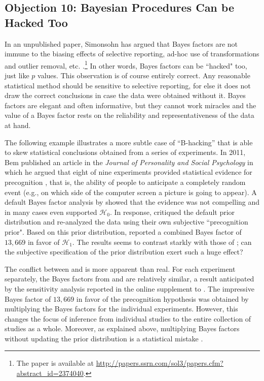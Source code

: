 \subsection{Objection 10: Bayesian Procedures Can be Hacked Too}
In an unpublished paper, Simonsohn has argued that Bayes factors are not immune to the biasing effects of selective reporting, ad-hoc use of transformations and outlier removal, etc. \cite{SimonsohnBayeshacking}.\footnote{The paper is available at \url{http://papers.ssrn.com/sol3/papers.cfm?abstract_id=2374040}.} In other words, Bayes factors can be ``hacked" too, just like $p$ values. This observation is of course entirely correct. Any reasonable statistical method should be sensitive to selective reporting, for else it does not draw the correct conclusions in case the data were obtained without it. Bayes factors are elegant and often informative, but they cannot work miracles and the value of a Bayes factor rests on the reliability and representativeness of the data at hand.

The following example illustrates a more subtle case of ``B-hacking'' that is able to skew statistical conclusions obtained from a series of experiments. In 2011, Bem published an article in the \emph{Journal of Personality and Social Psychology} in which he argued that eight of nine experiments provided statistical evidence for precognition \cite{Bem2011}, that is, the ability of people to anticipate a completely random event (e.g., on which side of the computer screen a picture is going to appear). A default Bayes factor analysis by  showed that the evidence was not compelling and in many cases even supported $\mathcal{H}_0$. In response,  critiqued the default prior distribution and re-analyzed the data using their own subjective ``precognition prior". Based on this prior distribution,  reported a combined Bayes factor of $13,669$ in favor of $\mathcal{H}_1$. The results seems to contrast starkly with those of ; can the subjective specification of the prior distribution exert such a huge effect?

The conflict between  and  is more apparent than real. For each experiment separately, the Bayes factors from  and  are relatively similar, a result anticipated by the sensitivity analysis reported in the online supplement to . The impressive Bayes factor of $13,669$ in favor of the precognition hypothesis was obtained by multiplying the Bayes factors for the individual experiments. However, this changes the focus of inference from individual studies to the entire collection of studies as a whole. Moreover, as explained above, multiplying Bayes factors without updating the prior distribution is a statistical mistake \cite{Jeffreys1961,RouderMorey2011,WagenmakersEtAl2016Bathing}.

